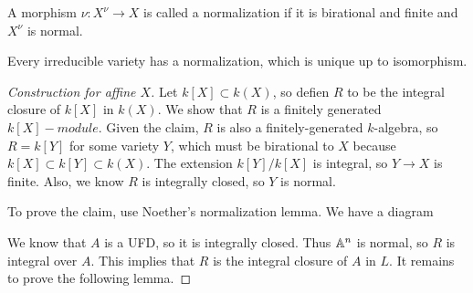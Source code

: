 \documentclass[twoside, 10pt]{article}
\begin{document}
        \begin{defn} A morphism $\nu:X^{\nu} \to X$ is called a normalization
        if it is birational and finite and $X^{\nu}$ is normal.  \end{defn}

        \begin{thm} Every irreducible variety has a normalization, which is
            unique up to isomorphism.  \begin{proof}[Construction for affine
                $X$] Let $k[X] \subset k(X)$, so defien $R$ to be the integral
                closure of $k[X]$ in $k(X)$. We show that $R$ is a finitely
                generated $k[X]-module$. Given the claim, $R$ is also a
                finitely-generated $k$-algebra, so $R=k[Y]$ for some variety
                $Y$, which must be birational to $X$ because $k[X] \subset k[Y]
                \subset k(X)$. The extension $k[Y] /k[X]$ is integral, so $Y
                \to X$ is finite. Also, we know $R$ is integrally closed, so
                $Y$ is normal.

                To prove the claim, use Noether's normalization lemma. We have
                a diagram

                \begin{center} 
                \end{center} We know that $A$ is a UFD, so it is integrally
                closed. Thus $\mathbb{A}^n$ is normal, so $R$ is integral over $A$.
                This implies that $R$ is the integral closure of $A$ in $L$. It
                remains to prove the following lemma.  \end{proof} \end{thm}
\end{document}
